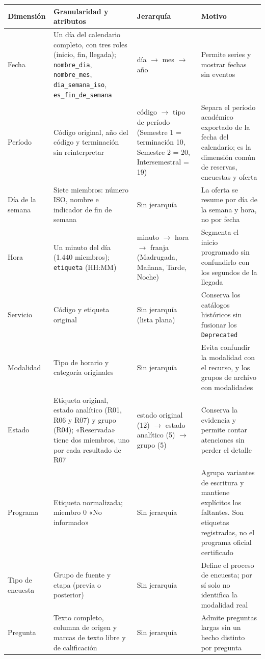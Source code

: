 \documentclass[11pt,letterpaper]{article}
\begin{document}
\begingroup\small\setlength{\tabcolsep}{4pt}\renewcommand{\arraystretch}{1.15}
\begin{longtable}{>{\raggedright\arraybackslash}p{}>{\raggedright\arraybackslash}p{}>{\raggedright\arraybackslash}p{}>{\raggedright\arraybackslash}p{}}
\toprule
\textbf{Dimensión} & \textbf{Granularidad y atributos} & \textbf{Jerarquía} & \textbf{Motivo} \\
\midrule
\endhead
Fecha & Un día del calendario completo, con tres roles (inicio, fin, llegada); \texttt{nombre\_\allowbreak{}dia}, \texttt{nombre\_\allowbreak{}mes}, \texttt{dia\_\allowbreak{}semana\_\allowbreak{}iso}, \texttt{es\_\allowbreak{}fin\_\allowbreak{}de\_\allowbreak{}semana} & día $\rightarrow$ mes $\rightarrow$ año & Permite series y mostrar fechas sin eventos \\
Período & Código original, año del código y terminación sin reinterpretar & código $\rightarrow$ tipo de período (Semestre 1 = terminación 10, Semestre 2 = 20, Intersemestral = 19) & Separa el período académico exportado de la fecha del calendario; es la dimensión común de reservas, encuestas y oferta \\
Día de la semana & Siete miembros: número ISO, nombre e indicador de fin de semana & Sin jerarquía & La oferta se resume por día de la semana y hora, no por fecha \\
Hora & Un minuto del día (1.440 miembros); \texttt{etiqueta} (HH:MM) & minuto $\rightarrow$ hora $\rightarrow$ franja (Madrugada, Mañana, Tarde, Noche) & Segmenta el inicio programado sin confundirlo con los segundos de la llegada \\
Servicio & Código y etiqueta original & Sin jerarquía (lista plana) & Conserva los catálogos históricos sin fusionar los \texttt{Deprecated} \\
Modalidad & Tipo de horario y categoría originales & Sin jerarquía & Evita confundir la modalidad con el recurso, y los grupos de archivo con modalidades \\
Estado & Etiqueta original, estado analítico (R01, R06 y R07) y grupo (R04); «Reservada» tiene dos miembros, uno por cada resultado de R07 & estado original (12) $\rightarrow$ estado analítico (5) $\rightarrow$ grupo (5) & Conserva la evidencia y permite contar atenciones sin perder el detalle \\
Programa & Etiqueta normalizada; miembro 0 «No informado» & Sin jerarquía & Agrupa variantes de escritura y mantiene explícitos los faltantes. Son etiquetas registradas, no el programa oficial certificado \\
Tipo de encuesta & Grupo de fuente y etapa (previa o posterior) & Sin jerarquía & Define el proceso de encuesta; por sí solo no identifica la modalidad real \\
Pregunta & Texto completo, columna de origen y marcas de texto libre y de calificación & Sin jerarquía & Admite preguntas largas sin un hecho distinto por pregunta \\
\bottomrule
\end{longtable}
\endgroup
\end{document}
